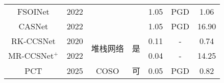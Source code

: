 \begin{table}[htbp]
{\begin{tabular}{ccccccc}
      FSOINet                               & 2022  &                                 &                   & 1.05          & PGD   & 1.06      \\
      CASNet                                 & 2022  &                                 &                   & 1.05          & PGD   & 16.90     \\
      \cline{1-2}\cline{5-7}
      RK-CCSNet                           & 2020  & \multirow{2}{*}{堆栈网络}     & \multirow{2}{*}{是} & 0.11          & -               & 0.74      \\
      MR-CCSNet$^{+}$                     & 2022  &                                 &                   & 0.04          & -               & 14.25     \\
      \cline{1-2}\cline{5-7}
      PCT                                 & 2025  & COSO                 & 可                & 0.05          & PGD   & 0.82      \\
      \bottomrule
    \end{tabular}
  }
\end{table}

